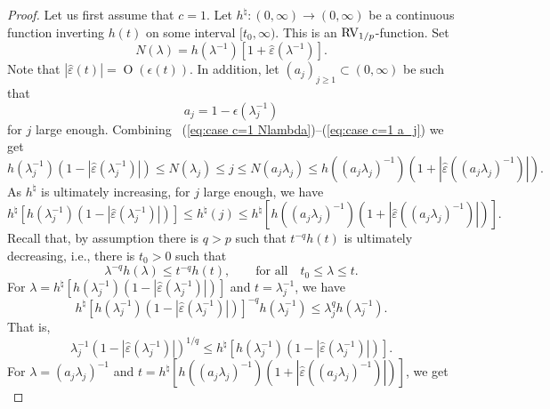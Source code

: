 \documentclass[10pt, a4paper]{amsart}
\newcommand{\op}{\operatorname}
\numberwithin{equation}{section}
\theoremstyle{definition}
\theoremstyle{remark}
\newcommand{\RV}{\textup{RV}}
\begin{document}
\begin{proof}
Let us first assume that $c=1$. Let $h^\natural:(0,\infty)\to(0,\infty)$ be a continuous function inverting $h(t)$ on some interval $[t_0,\infty)$. This is an $\RV_{1/p}$-function.
Set \begin{equation}\label{eq:case c=1 Nlambda}
N(\lambda)=h(\lambda^{-1})[1+\hat{\varepsilon}(\lambda^{-1})].
\end{equation} Note that  $|\hat{\varepsilon}(t)|=\op{O}(\epsilon(t))$. In addition, let $(a_j)_{j\geq1}\subset(0,\infty)$ be such that
\begin{equation}\label{eq:case c=1 a_j}
a_j=1-\epsilon(\lambda_j^{-1})
\end{equation} for $j$ large enough. Combining ~(\ref{eq:case c=1 Nlambda})--(\ref{eq:case c=1 a_j}) we get
\begin{equation*}
h(\lambda_j^{-1})(1-|\hat{\varepsilon}(\lambda_j^{-1})|)\leq N(\lambda_j)\leq j \leq N(a_j\lambda_j)\leq h((a_j\lambda_j)^{-1})(1+|\hat{\varepsilon}((a_j\lambda_j)^{-1})|).
\end{equation*}
As $h^\natural$ is ultimately increasing, for $j$ large enough, we have
\begin{equation*}
h^\natural[	h(\lambda_j^{-1})(1-|\hat{\varepsilon}(\lambda_j^{-1})|)]\leq h^\natural(j)\leq h^\natural[  h((a_j\lambda_j)^{-1})(1+|\hat{\varepsilon}((a_j\lambda_j)^{-1})|)].
\end{equation*}
Recall that, by assumption there is $q>p$ such that $t^{-q}h(t)$ is ultimately decreasing, i.e., there is $t_0>0$ such that
\begin{equation*}
\lambda^{-q}h(\lambda)\leq t^{-q}h(t),\qquad\mbox{for all}\quad t_0\leq \lambda\leq t.
\end{equation*}
For $\lambda=h^\natural[	h(\lambda_j^{-1})(1-|\hat{\varepsilon}(\lambda_j^{-1})|)]$ and $t=\lambda_j^{-1}$, we have
\begin{equation*}
h^\natural[	h(\lambda_j^{-1})(1-|\hat{\varepsilon}(\lambda_j^{-1})|)]^{-q}h(\lambda_j^{-1})\leq \lambda_j^qh(\lambda_j^{-1}).
\end{equation*}
That is,
\begin{equation}\label{eq:case c=1 lower}
\lambda_j^{-1}(1-|\hat{\varepsilon}(\lambda_j^{-1})|)^{1/q}\leq h^\natural[	h(\lambda_j^{-1})(1-|\hat{\varepsilon}(\lambda_j^{-1})|)].
\end{equation}
For $\lambda=(a_j\lambda_j)^{-1}$ and $t=h^\natural[  h((a_j\lambda_j)^{-1})(1+|\hat{\varepsilon}((a_j\lambda_j)^{-1})|)]$, we get
\begin{equation*}

\end{equation*}
\end{proof}
\end{document}
